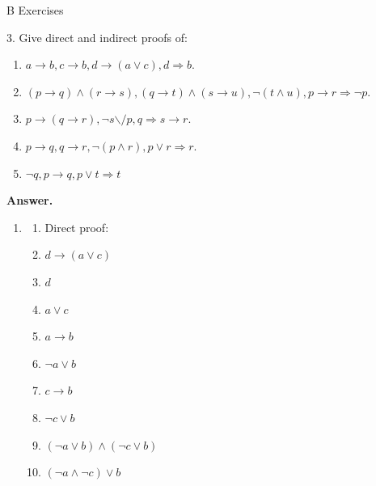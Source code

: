 \documentclass[10pt,]{book}
\theoremstyle{plain}
\theoremstyle{definition}
\theoremstyle{definition}
\theoremstyle{definition}
\theoremstyle{definition}
\begin{document}
\par\smallskip\noindent
\hypertarget{exercisegroup-7}{}\typeout{************************************************}
\typeout{************************************************}
B Exercises%
\begin{exercisegroup}
\item[3.]\hypertarget{exercise-26}{}Give direct and indirect proofs of:%
\par
\leavevmode%
\begin{enumerate}[label=\alph*]
\item\hypertarget{li-119}{}\(a \rightarrow  b, c \rightarrow  b, d\rightarrow  (a \lor  c), d\Rightarrow  b\).%
\item\hypertarget{li-120}{} \((p\to q) \land (r\to s), (q\rightarrow t) \land  (s \to  u), \neg (t \land u), p \rightarrow  r \Rightarrow  \neg p\).%
\item\hypertarget{li-121}{}\(p\to (q\to r),\neg s\text{$\backslash $/}p,q\Rightarrow s\to r\).%
\item\hypertarget{li-122}{} \(p\rightarrow  q, q\rightarrow  r, \neg (p \land  r), p \lor  r \Rightarrow  r\).%
\item\hypertarget{li-123}{}\(\neg q, p\to q, p\lor t \Rightarrow t\)%
\end{enumerate}
%
\par\smallskip
\par\smallskip
\noindent\textbf{Answer.}\hypertarget{answer-12}{}\quad
\leavevmode%
\begin{enumerate}[label=\alph*]
\item\hypertarget{li-124}{}%
\begin{enumerate}[label=\arabic*]
\item\hypertarget{li-125}{} Direct proof:%
\item\hypertarget{li-126}{} \(d\to (a\lor c)\)%
\item\hypertarget{li-127}{} \(d\)%
\item\hypertarget{li-128}{} \(a\lor c\)%
\item\hypertarget{li-129}{} \(a\to b\)%
\item\hypertarget{li-130}{} \(\neg a \lor b\)%
\item\hypertarget{li-131}{} \(c\to b\)%
\item\hypertarget{li-132}{} \(\neg c\lor b\)%
\item\hypertarget{li-133}{} \((\neg a\lor b)\land (\neg c\lor b)\)%
\item\hypertarget{li-134}{} \((\neg a\land \neg c) \lor b\)%

\end{enumerate}
\end{enumerate}
\end{exercisegroup}
\end{document}
